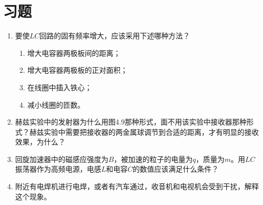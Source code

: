 \section*{习题}
\begin{enumerate}
	\item 要使$LC$回路的固有频率增大，应该采用下述哪种方法？
	\begin{enumerate}
		\item 增大电容器两极板间的距离；
		\item 增大电容器两极板的正对面积；
		\item 在线圈中插入铁心；
		\item 减小线圈的匝数。
	\end{enumerate}
	\item 赫兹实验中的发射器为什么用图4.9那种形式，面不用该实验中接收器那种形式？赫兹实验中需要把接收器的两金属球调节到合适的距离，才有明显的接收效果，为什么？
	\item 回旋加速器中的磁感应强度为$B$，被加速的粒子的电量为$q$，质量为$m$。用$LC$振荡器作为高频电源，电感$L$和电容$C$的数值应该满足什么条件？
	\item 附近有电焊机进行电焊，或者有汽车通过，收音机和电视机会受到干扰，解释这个现象。
\end{enumerate}













